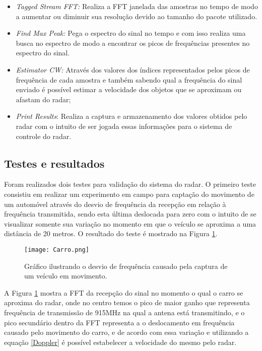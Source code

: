 \begin{itemize}
    \item\emph{Tagged Stream FFT:} Realiza a FFT janelada das amostras no tempo de modo  a aumentar ou diminuir sua resolução devido ao tamanho do pacote utilizado.
    \item \emph{Find Max Peak:} Pega o espectro do sinal no tempo e com isso realiza uma busca no espectro de modo a encontrar os picos de frequências presentes no espectro do sinal.
    \item \emph{Estimator CW:} Através dos valores dos índices representados pelos picos de frequência de cada amostra e também sabendo qual a frequência do sinal enviado é possível estimar a velocidade dos objetos que se aproximam ou afastam do radar;
    \item \emph{Print Results}: Realiza a captura e armazenamento dos valores obtidos pelo radar com o intuito de ser jogada essas informações para o sistema de controle do radar.
\end{itemize} 

\subsection{Testes e resultados}

    Foram realizados dois testes para validação do sistema do radar. O primeiro teste consistiu em realizar um experimento em campo para captação do movimento de um automóvel através do desvio de frequência da recepção em relação à frequência transmitida, sendo esta última deslocada para zero com o intuito de se visualizar somente sua variação no momento em que o veículo se aproxima a uma distância de 20 metros. O resultado do teste é mostrado na Figura \ref{TVeiculo}.

\begin{figure}[H]
    \centering
    \texttt{[image: Carro.png]}
    \caption{Gráfico ilustrando o desvio de frequência causado pela captura de um veículo em movimento.}
    \label{TVeiculo}
\end{figure}

A Figura \ref{TVeiculo} mostra a FFT da recepção do sinal no momento o qual o carro se aproxima do radar, onde no centro temos o pico de maior ganho que representa frequência de transmissão de 915MHz na qual a antena está transmitindo, e o pico secundário dentro da FFT representa a o deslocamento em frequência causado pelo movimento do carro, e de acordo com essa variação e utilizando a equação \ref{Doppler} é possível estabelecer a velocidade do mesmo pelo radar.


